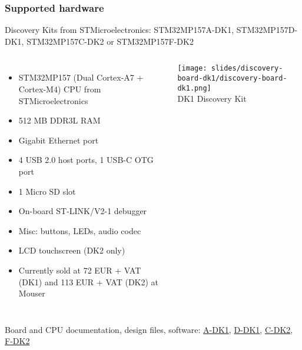 \begin{frame}
\frametitle{Supported hardware}
  Discovery Kits from STMicroelectronics: STM32MP157A-DK1, STM32MP157D-DK1, STM32MP157C-DK2 or STM32MP157F-DK2
  \footnotesize
  \begin{columns}
    \begin{itemize}
    \item STM32MP157 (Dual Cortex-A7 + Cortex-M4) CPU from STMicroelectronics
    \item 512 MB DDR3L RAM
    \item Gigabit Ethernet port
    \item 4 USB 2.0 host ports, 1 USB-C OTG port
    \item 1 Micro SD slot
    \item On-board ST-LINK/V2-1 debugger
    \item Misc: buttons, LEDs, audio codec
    \item LCD touchscreen (DK2 only)
    \item Currently sold at 72 EUR + VAT (DK1) and 113 EUR + VAT (DK2) at Mouser
    \end{itemize}
    \begin{center}
    \texttt{[image: slides/discovery-board-dk1/discovery-board-dk1.png]}\\
    DK1 Discovery Kit
    \end{center}
  \end{columns}
  \vspace{0.5em}
  Board and CPU documentation, design files, software:
  \href{https://www.st.com/en/evaluation-tools/stm32mp157a-dk1.html}{A-DK1},
  \href{https://www.st.com/en/evaluation-tools/stm32mp157d-dk1.html}{D-DK1},
  \href{https://www.st.com/en/evaluation-tools/stm32mp157c-dk2.html}{C-DK2},
  \href{https://www.st.com/en/evaluation-tools/stm32mp157f-dk2.html}{F-DK2}
\end{frame}
